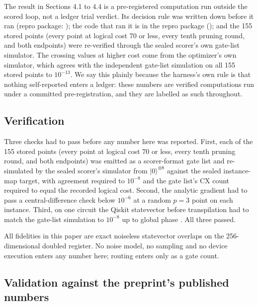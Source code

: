 \documentclass[11pt]{article}
\begin{document}
The result in Sections 4.1 to 4.4 is a pre-registered computation run outside the scored loop, not a ledger trial verdict. Its decision rule was written down before it ran (repro package: ); the code that ran it is in the repro package (); and the 155 stored points (every point at logical cost 70 or less, every tenth pruning round, and both endpoints) were re-verified through the sealed scorer's own gate-list simulator. The crossing values at higher cost come from the optimizer's own simulator, which agrees with the independent gate-list simulation on all 155 stored points to $10^{-13}$. We say this plainly because the harness's own rule is that nothing self-reported enters a ledger: these numbers are verified computations run under a committed pre-registration, and they are labelled as such throughout.

\subsection{Verification}

Three checks had to pass before any number here was reported. First, each of the 155 stored points (every point at logical cost 70 or less, every tenth pruning round, and both endpoints) was emitted as a scorer-format gate list and re-simulated by the sealed scorer's simulator from $|0\rangle^{\otimes 8}$ against the sealed instance-map target, with agreement required to $10^{-8}$ and the gate list's CX count required to equal the recorded logical cost. Second, the analytic gradient had to pass a central-difference check below $10^{-6}$ at a random $p = 3$ point on each instance. Third, on one circuit the Qiskit statevector before transpilation had to match the gate-list simulation to $10^{-8}$ up to global phase \cite{qiskit2024}. All three passed.

All fidelities in this paper are exact noiseless statevector overlaps on the 256-dimensional doubled register. No noise model, no sampling and no device execution enters any number here; routing enters only as a gate count.

\subsection{Validation against the preprint's published numbers}
\end{document}
